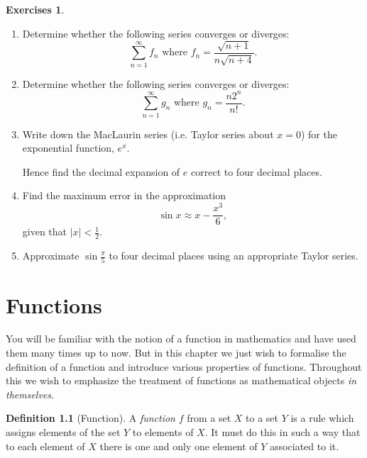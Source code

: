 \documentclass[extrafontsizes, twoside, a4paper]{memoir}
\theoremstyle{plain}%
\theoremstyle{definition}
\newtheorem{defn}{Definition}[chapter]
\newtheorem{exer}{Exercises}[chapter]
\theoremstyle{remark}
\newcommand{\postitemskip}{\vskip 0.2in}
\newcommand{\solution}[1]{}
\newcommand{\summary}[1]{#1}
\begin{document}
\begin{exer}
\begin{enumerate}
\solution{Use the standard comparison test.
$$ \frac{\sin^2{(n)}}{n(n+3)} \leq \frac{1}{n(n+3)} < \frac{1}{n^2} .$$
$\sum \frac{1}{n^2}$ is convergent and so by the comparison test so is $\sum e_n$.}

\item
Determine whether the following series converges or diverges:
$$\sum_{n=1}^\infty f_n \mbox{ where } f_n =  \frac{\sqrt{n+1}}{n \sqrt{n+4}}.$$

\solution{Use the limit comparison test with the comparison series $\sum \frac{1}{n}$.
$$\lim_{n \to \infty} \frac{\sqrt{n+1}}{n \sqrt{n+4}} \frac{1}{\frac{1}{n}}
= \lim_{n \to \infty} \frac{\sqrt{n+1}}{\sqrt{n+4}}
= \lim_{n \to \infty} \frac{\sqrt{1+\frac{1}{n}}}{\sqrt{1+\frac{4}{n}}} = 1.$$
The limit of the ratios is 1 and hence by the limit comparison test the series $\sum f_n$ diverges as $\sum \frac{1}{n}$ is divergent.}

\item
Determine whether the following series converges or diverges:
$$ \sum_{n=1}^\infty  g_n \mbox{ where } g_n =\frac{n 2^n}{n!}.$$
\solution{Use the ratio test.
$$\lim_{n \to \infty} \frac{(n+1) 2^{n+1}}{(n+1)!}\frac{n!}{n 2^n}
=\lim_{n \to \infty} \frac{2}{n} = 0.$$
The limit of the ratios is $0$ and so the series $\sum g_n$ converges by the ratio test.
}


\item
 Write down the MacLaurin series (i.e. Taylor series about $x=0$) for the exponential function, $e^x$.

\noindent
Hence find the decimal expansion of $e$ correct to four decimal places.
\postitemskip
\item
 Find the maximum error in the approximation
$$\sin{x} \approx x - \frac{x^3}{6},$$
given that $|x| < \frac{1}{2}$.
\postitemskip
\item
 Approximate $\sin{\frac{\pi}{5}}$ to four decimal places using an appropriate Taylor series.
\postitemskip
\end{enumerate}
\end{exer}
\cleardoublepage
%
\chapter{Functions}
\summary{You will be familiar with the notion of a function in mathematics and have used them many times up to now. But in this chapter we just wish to formalise the definition of a function and introduce various properties of functions. Throughout this we wish to emphasize the treatment of functions as mathematical objects \textit{in themselves}.}
\begin{defn}[Function]
A \emph{function} $f$ from a set $X$ to a set $Y$ is a rule which assigns elements of the set $Y$ to elements of $X$. It must do this in such a way that to each element of $X$ there is one and only one element of $Y$ associated to it.
\end{defn}
\end{document}
